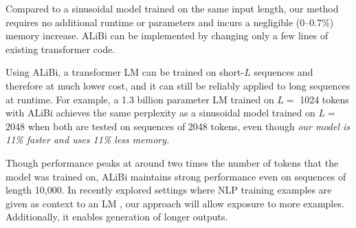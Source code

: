 Compared to a sinusoidal model trained on the same input length, our method requires no additional runtime or parameters and incurs a negligible (0--0.7\%) memory increase.  ALiBi can be implemented by changing only a few lines of existing transformer code. 


Using ALiBi, a transformer LM can be trained on short-$L$ sequences and therefore at much lower cost, and it can still be reliably applied to long sequences at runtime. For example, a 1.3 billion parameter LM trained on $L=$ 1024 tokens with ALiBi achieves the same perplexity as a sinusoidal model trained on $L=$ 2048 when both are tested on sequences of 2048 tokens, even though \textit{our model is 11\% faster and uses 11\% less memory. }%


Though performance peaks at around two times the number of tokens that the model was trained on, ALiBi maintains strong performance even on sequences of length 10,000. 
In recently explored settings where NLP training examples are given as context to an LM \citep{gpt3}, our approach will allow exposure to more examples. Additionally, it enables generation of longer outputs.












